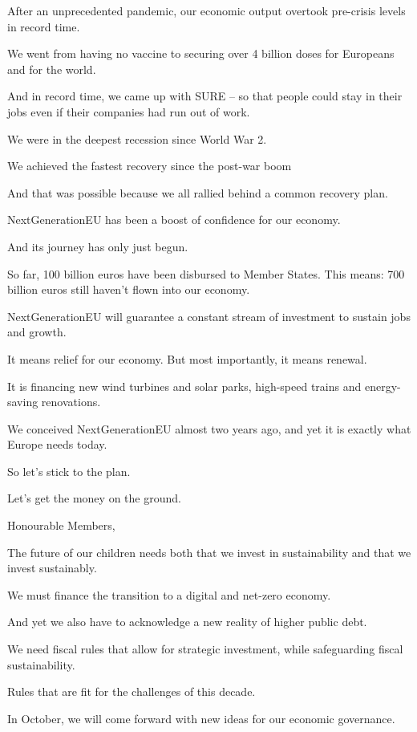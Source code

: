\documentclass[a4paper,11pt]{article}
\begin{document}
After an unprecedented pandemic, our economic output overtook pre-crisis levels in record time.

We went from having no vaccine to securing over 4 billion doses for Europeans and for the world.

And in record time, we came up with SURE – so that people could stay in their jobs even if their companies had run out of work.

We were in the deepest recession since World War 2.

We achieved the fastest recovery since the post-war boom

And that was possible because we all rallied behind a common recovery plan.

NextGenerationEU has been a boost of confidence for our economy.

And its journey has only just begun.

So far, 100 billion euros have been disbursed to Member States. This means: 700 billion euros still haven't flown into our economy.

NextGenerationEU will guarantee a constant stream of investment to sustain jobs and growth.

It means relief for our economy. But most importantly, it means renewal.

It is financing new wind turbines and solar parks, high-speed trains and energy-saving renovations.

We conceived NextGenerationEU almost two years ago, and yet it is exactly what Europe needs today.

So let's stick to the plan.

Let's get the money on the ground.

 

Honourable Members,

The future of our children needs both that we invest in sustainability and that we invest sustainably.

We must finance the transition to a digital and net-zero economy.

And yet we also have to acknowledge a new reality of higher public debt.

We need fiscal rules that allow for strategic investment, while safeguarding fiscal sustainability.

Rules that are fit for the challenges of this decade.

In October, we will come forward with new ideas for our economic governance.
\end{document}
